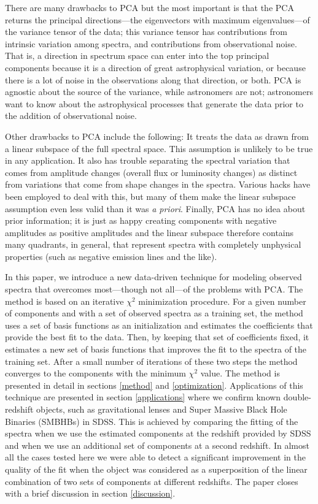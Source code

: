 \documentclass[apj]{emulateapj}
\begin{document}
There are many drawbacks to PCA but the most important is that the PCA returns the principal directions---the eigenvectors with maximum eigenvalues---of the variance tensor of the data; this variance tensor has contributions from intrinsic variation among spectra, and contributions from observational noise.  That is, a direction in spectrum space can enter into the top principal components because it is a direction of great astrophysical variation, or because there is a lot of noise in the observations along that direction, or both.  PCA is agnostic about the source of the variance, while astronomers are not; astronomers want to know about the astrophysical processes that generate the data prior to the addition of observational noise.

Other drawbacks to PCA include the following: It treats the data as drawn from a linear subspace of the full spectral space. This
assumption is unlikely to be true in any application.  It also has trouble separating the spectral variation that comes from amplitude
changes (overall flux or luminosity changes) as distinct from variations that come from shape changes in the spectra.  Various hacks
have been employed to deal with this, but many of them make the linear subspace assumption even less valid than it was \textit{a priori}. Finally, PCA has no idea about prior information; it is just as happy creating components with negative amplitudes as positive amplitudes and the linear subspace therefore contains many quadrants, in general, that represent spectra with completely unphysical properties (such as negative emission lines and the like).

In this paper, we introduce a new data-driven technique for modeling observed spectra that overcomes most---though not all---of the problems with PCA. The method is based on an iterative $\chi^2$ minimization procedure. For a given number of components and with a set of observed spectra as a training set, the method uses a set of basis functions as an initialization and estimates the coefficients that provide the best fit to the data. Then, by keeping that set of coefficients fixed, it estimates a new set of basis functions that improves the fit to the spectra of the training set. After a small number of iterations of these two steps the method converges to the components with the minimum $\chi^2$ value. The method is presented in detail in sections \ref{method} and \ref{optimization}. Applications of this technique are presented in section \ref{applications} where we confirm known double-redshift objects, such as gravitational lenses and Super Massive Black Hole Binaries (SMBHBs) in SDSS. This is achieved by comparing the fitting of the spectra when we use the estimated components at the redshift provided by SDSS and when we use an additional set of components at a second redshift. In almost all the cases tested here we were able to detect a significant improvement in the quality of the fit when the object was considered as a superposition of the linear combination of two sets of components at different redshifts. The paper closes with a brief discussion in section \ref{discussion}.
\end{document}
